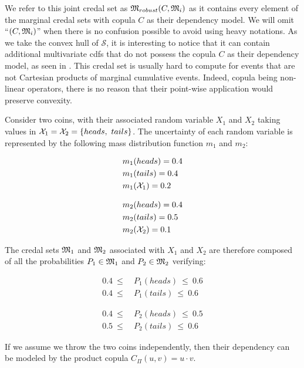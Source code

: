 We refer to this joint credal set as $\mathfrak{M}_{robust}(C,\mathfrak{M}_i)$ as it contains every element of the marginal credal sets with copula $C$ as their dependency model. We will omit ``$(C,\mathfrak{M}_i)$'' when there is no confusion possible to avoid using heavy notations. As we take the convex hull of $\mathcal{S}$, it is interesting to notice that it can contain additional multivariate \acrshort{cdf}s that do not possess the copula $C$ as their dependency model, as seen in . This credal set is usually hard to compute for events that are not Cartesian products of marginal cumulative events. Indeed, copula being non-linear operators, there is no reason that their point-wise application would preserve convexity. 

\begin{example}\label{ex:robust_credal_set}
Consider two coins, with their associated random variable $X_1$ and $X_2$ taking values in $\mathcal{X}_1=\mathcal{X}_2=\{heads, ~tails\}$. The uncertainty of each random variable is represented by the following mass distribution function $m_1$ and $m_2$:\newline\medskip
\begin{minipage}{0.5\linewidth}
\begin{align*}
    &m_1(heads)=0.4 \\
    &m_1(tails) = 0.4\\
    &m_1(\mathcal{X}_1)=0.2
\end{align*}
\end{minipage}
\begin{minipage}{0.5\linewidth}
\begin{align*}
    &m_2(heads)=0.4\\
    &m_2(tails) = 0.5\\
    &m_2(\mathcal{X}_2)=0.1
\end{align*}
\end{minipage}\bigskip\newline
The credal sets $\mathfrak{M}_1$ and $\mathfrak{M}_2$ associated with $X_1$ and $X_2$ are therefore composed of all the probabilities $P_1\in\mathfrak{M}_1$ and $P_2\in\mathfrak{M}_2$ verifying:\newline\medskip
\begin{minipage}{0.5\linewidth}
\begin{align*}
    0.4 ~\leqslant~ &P_1(heads) ~\leqslant~ 0.6 \\
    0.4 ~\leqslant~ &P_1(tails) ~\leqslant~ 0.6
\end{align*}
\end{minipage}
\begin{minipage}{0.5\linewidth}
\begin{align*}
    0.4 ~\leqslant~ &P_2(heads) ~\leqslant~ 0.5 \\
    0.5 ~\leqslant~ &P_2(tails) ~\leqslant~ 0.6
\end{align*}
\end{minipage}\bigskip\newline
If we assume we throw the two coins independently, then their dependency can be modeled by the product copula $C_\Pi(u,v)=u\cdot v$.


\end{example}
